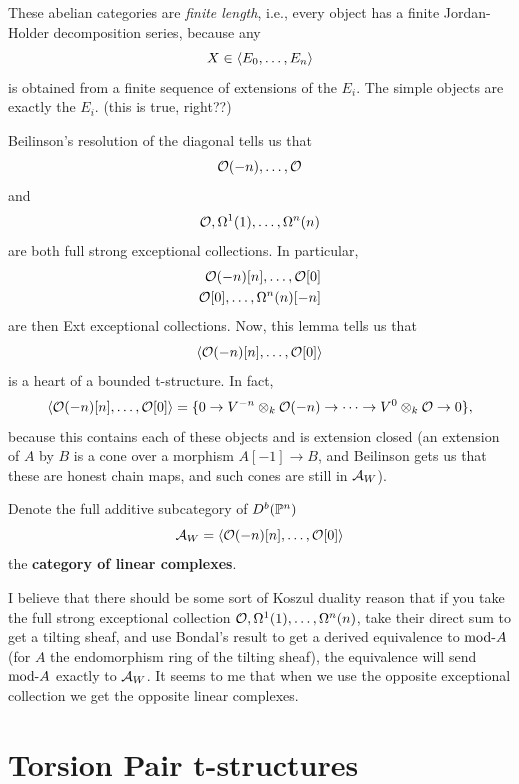 \documentclass[12pt]{article}
\begin{document}
\begin{rmk}
    These abelian categories are \textit{finite length}, i.e., every object has a finite Jordan-Holder decomposition series, because any
    \[X \in \<E_0,\dots,E_n\>\]
    is obtained from a finite sequence of extensions of the $E_i$. {\color{red} The simple objects are exactly the $E_i$. (this is true, right??)}
\end{rmk}

\begin{eg}
    Beilinson's resolution of the diagonal tells us that
    \[\cO(-n),\dots,\cO\]
    and
    \[\cO,\Omega^1(1),\dots,\Omega^n(n)\]
    are both full strong exceptional collections. In particular,
    \begin{align*}
        \cO(-n)[n],\dots,\cO[0]\\
        \cO[0],\dots,\Omega^n(n)[-n]
    \end{align*}
    are then Ext exceptional collections. Now, this lemma tells us that
    \[\<\cO(-n)[n],\dots,\cO[0]\>\]
    is a heart of a bounded t-structure. In fact, 
    \[\<\cO(-n)[n],\dots,\cO[0]\> = \{0\to V^{-n} \otimes_k \cO(-n) \to \cdots \to V^0 \otimes_k \cO \to 0\},\]
    because this contains each of these objects and is extension closed (an extension of $A$ by $B$ is a cone over a morphism $A[-1] \to B$, and Beilinson gets us that these are honest chain maps, and such cones are still in $\cA_W$).
\end{eg}

\begin{defn}
    Denote the full additive subcategory of $D^b(\P^n)$
    \[\cA_W = \<\cO(-n)[n],\dots,\cO[0]\>\]
    the \textbf{category of linear complexes}.
\end{defn}

\begin{rmk}
    {\color{red} I believe that there should be some sort of Koszul duality reason that if you take the full strong exceptional collection $\cO,\Omega^1(1),\dots,\Omega^n(n)$, take their direct sum to get a tilting sheaf, and use Bondal's result to get a derived equivalence to $\rmod A$ (for $A$ the endomorphism ring of the tilting sheaf), the equivalence will send $\rmod A$ exactly to $\cA_W$. It seems to me that when we use the opposite exceptional collection we get the opposite linear complexes}.
\end{rmk}

\section{Torsion Pair t-structures}
\end{document}
